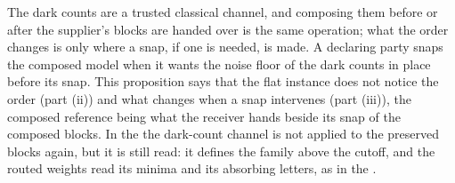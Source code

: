 
The dark counts are a trusted classical channel, and composing them before or
after the supplier's blocks are handed over is the same operation; what the
order changes is only where a snap, if one is needed, is made. A declaring
party snaps the composed model when it wants the noise floor of the dark
counts in place before its snap. This proposition says that the flat instance
does not notice the order (part (ii)) and what changes when a snap
intervenes (part (iii)), the composed reference being what the receiver
hands beside its snap of the composed blocks.
In the  the dark-count channel is not applied to the
preserved blocks again, but it is still read: it defines the family above the
cutoff, and the routed weights read its minima and its absorbing letters, as
in the .

